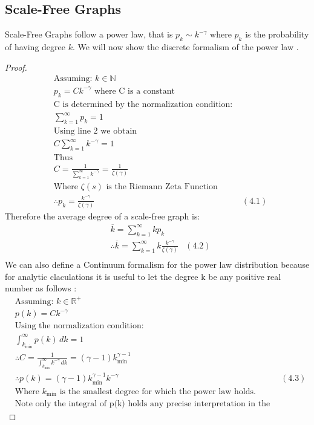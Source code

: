 \documentclass{article}
\begin{document}
        \subsection{Scale-Free Graphs}
        Scale-Free Graphs follow a power law, that is $p_{k} \sim k^{-\gamma}$ where $p_{k}$ is the probability of having degree $k$. We will now show the discrete formalism of the power law \parencite{barabasi2013network}.
        \begin{proof}
            \begin{align*}
                &\text{Assuming: } k\in \mathbb{N}\\
                &p_{k} = Ck^{-\gamma} \text{ where C is a constant}\\
                &\text{C is determined by the normalization condition: }\\
                &\sum_{k = 1}^{\infty}p_{k} = 1\\
                &\text{Using line 2 we obtain}\\
                &C\sum_{k=1}^{\infty}k^{-\gamma} = 1\\
                &\text{Thus}\\
                &C = \frac{1}{\sum_{k=1}^{\infty}k^{-\gamma}} = \frac{1}{\zeta(\gamma)}\\
                &\text{Where $\zeta(s)$ is the Riemann Zeta Function}\\
                &\therefore p_{k}=\frac{k^{-\gamma}}{\zeta(\gamma)} &(4.1)
            \end{align*}
            Therefore the average degree of a scale-free graph is:
            \begin{align*}
                &\overline{k} = \sum_{k=1}^{\infty}kp_{k}\\
                &\therefore \overline{k} = \sum_{k=1}^{\infty}k\frac{k^{-\gamma}}{\zeta(\gamma)} &(4.2)\\
            \end{align*}
            We can also define a Continuum formalism for the power law distribution because for analytic claculations it is useful to let the degree k be any positive real number as follows \parencite{barabasi2013network}:
            \begin{align*}
                &\text{Assuming: } k\in \mathbb{R}^{+}\\
                &p(k) = Ck^{-\gamma}\\
                &\text{Using the normalization condition:}\\
                &\int_{k_{\text{min}}}^{\infty}p(k) \,dk = 1\\
                &\therefore C = \frac{1}{\int_{k_{\text{min}}}^{\infty}k^{-\gamma} \,dk} = (\gamma -1)k_{\text{min}}^{\gamma-1}\\
                &\therefore p(k) = (\gamma -1)k_{\text{min}}^{\gamma-1}k^{-\gamma}  &(4.3)\\
                &\text{Where $k_{\text{min}}$ is the smallest degree for which the power law holds.}\\
                &\text{Note only the integral of p(k) holds any precise interpretation in the continuum formalism}
            \end{align*}
        \end{proof}
\end{document}
